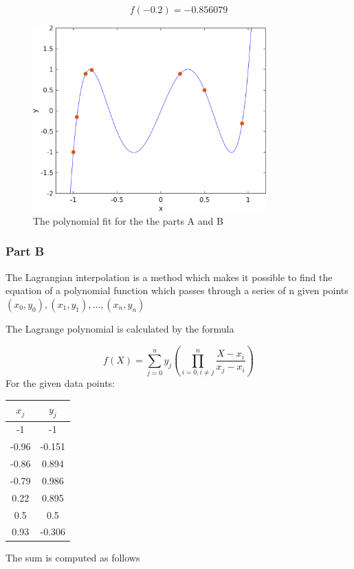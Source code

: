 \documentclass[12pt, a4paper]{article}
\numberwithin{equation}{section}
\begin{document}
\begin{equation}
f(-0.2)= -0.856079
\end{equation}

\begin{figure}[H]
  \centering
  \includegraphics[width=0.8\textwidth]{img/Q8.png}
  \captionsetup{justification=centering}
  \caption{The polynomial fit for the the parts A and B}
\end{figure}

\subsubsection{Part B}
The Lagrangian interpolation is a method which makes it possible to find the equation of a polynomial function which passes through a series of n given points ${(x_0,y_0), (x_1,y_1), \dots, (x_n,y_n)}$

The Lagrange polynomial is calculated by the formula
\

\begin{equation}
    f(X) = \sum_{j=0}^n y_j \left(\prod_{i=0,i\neq j}^n \frac{X-x_i}{x_j-x_i} \right)
\end{equation}
For the given data points:

\begin{table}[!ht]
    \centering
    \begin{tabular}{cc}
    \hline
        $x_j$ & $y_j$ \\ \hline
        -1 & -1 \\ 
        -0.96 & -0.151 \\ 
        -0.86 & 0.894 \\ 
        -0.79 & 0.986 \\ 
        0.22 & 0.895 \\ 
        0.5 & 0.5 \\ 
        0.93 & -0.306 \\ \hline
    \end{tabular}
\end{table}
The sum is computed as follows
\end{document}

